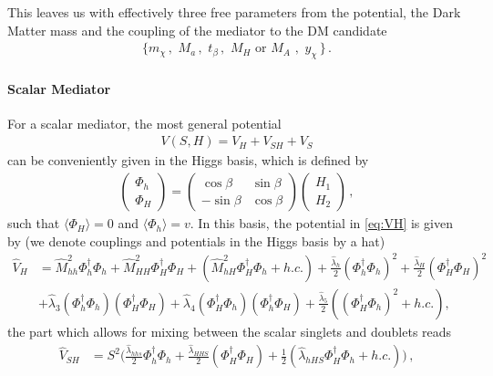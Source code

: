 \newline
%
This leaves us with effectively three free parameters from the potential, the Dark Matter mass and the coupling of the mediator to the DM candidate
\begin{align}
\big\{ m_\chi\,,\,\,M_a\,,\,\, t_\beta\,, \,\, M_H\,\,\text{or}\,\,M_A\,\,, \,\, y_\chi\,\big\}\,.
\end{align}



\paragraph{Scalar Mediator}
For a scalar mediator, the most general potential 
\begin{align}
V(S, H)= V_H + V_{SH} +V_S
\end{align}
can be conveniently given in the Higgs basis, which is defined by  
\begin{align}
\begin{pmatrix}
\Phi_h\\
\Phi_H
\end{pmatrix} =\begin{pmatrix}
\cos\beta & \sin \beta \\
-\sin\beta & \cos \beta 
\end{pmatrix}
\begin{pmatrix}
H_1\\
H_2
\end{pmatrix}\,,
\end{align}
such that  $\langle \Phi_H \rangle =0$ and $\langle \Phi_h\rangle=v$. In this basis, the potential in \eqref{eq:VH} is given by (we denote couplings and potentials in the Higgs basis by a hat)
\begin{align}
\hat{V}_{H} &= \hat{M}_{hh}^2 \Phi_h^\dagger \Phi_h + \hat{M}_{HH}^2 \Phi_H^\dagger \Phi_H +  (\hat{M}_{hH}^2 \Phi_H^\dagger \Phi_h + h.c.) + \frac{\hat{\lambda}_h}{2} (\Phi_h^\dagger \Phi_h)^2 + \frac{\hat{\lambda}_H}{2} (\Phi_H^\dagger \Phi_H)^2 \nonumber \\
&+\hat{\lambda}_3 (\Phi_h^\dagger \Phi_h)(\Phi_H^\dagger \Phi_H) + \hat{\lambda}_4 (\Phi_H^\dagger \Phi_h)(\Phi_h^\dagger \Phi_H)  
+ \frac{\hat{\lambda}_5}{2} \left( (\Phi_H^\dagger \Phi_h)^2 + h.c.\right),
\end{align}
the part which allows for mixing between the scalar singlets and doublets reads
\begin{align}
\hat{V}_{SH}&=
  S^2 \bigg( \frac{\hat{\lambda}_{hhs}}{2} \Phi_h^\dagger \Phi_h +  \frac{\hat{\lambda}_{HHS}}{2}(\Phi_H^\dagger \Phi_H)+\frac{1}{2}(\hat{\lambda}_{hHS} \Phi_H^\dagger \Phi_h + h.c.)\bigg) \,,
\end{align}

